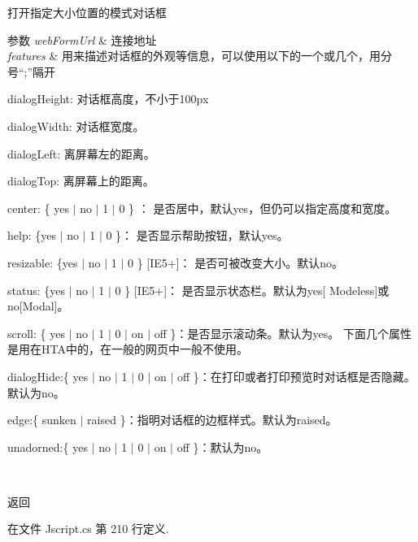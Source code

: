 打开指定大小位置的模式对话框 


\begin{DoxyParams}{参数}
{\em web\-Form\-Url} & 连接地址\\
\hline
{\em features} & 用来描述对话框的外观等信息，可以使用以下的一个或几个，用分号“;”隔开
\begin{DoxyEnumerate}
\item dialog\-Height\-: 对话框高度，不小于100px
\item dialog\-Width\-: 对话框宽度。
\item dialog\-Left\-: 离屏幕左的距离。
\item dialog\-Top\-: 离屏幕上的距离。
\item center\-: \{ yes $|$ no $|$ 1 $|$ 0 \} ： 是否居中，默认yes，但仍可以指定高度和宽度。
\item help\-: \{yes $|$ no $|$ 1 $|$ 0 \}： 是否显示帮助按钮，默认yes。
\item resizable\-: \{yes $|$ no $|$ 1 $|$ 0 \} \mbox{[}I\-E5+\mbox{]}： 是否可被改变大小。默认no。
\item status\-: \{yes $|$ no $|$ 1 $|$ 0 \} \mbox{[}I\-E5+\mbox{]}： 是否显示状态栏。默认为yes\mbox{[} Modeless\mbox{]}或no\mbox{[}Modal\mbox{]}。
\item scroll\-: \{ yes $|$ no $|$ 1 $|$ 0 $|$ on $|$ off \}：是否显示滚动条。默认为yes。 下面几个属性是用在\-H\-T\-A中的，在一般的网页中一般不使用。
\item dialog\-Hide\-:\{ yes $|$ no $|$ 1 $|$ 0 $|$ on $|$ off \}：在打印或者打印预览时对话框是否隐藏。默认为no。
\item edge\-:\{ sunken $|$ raised \}：指明对话框的边框样式。默认为raised。
\item unadorned\-:\{ yes $|$ no $|$ 1 $|$ 0 $|$ on $|$ off \}：默认为no。 
\end{DoxyEnumerate}\\
\hline
\end{DoxyParams}
\begin{DoxyReturn}{返回}

\end{DoxyReturn}


在文件 Jscript.\-cs 第 210 行定义.

